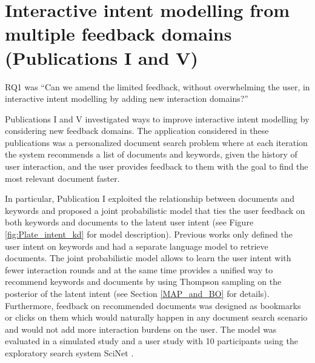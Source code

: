 \documentclass[dissertation,math,vertlayout,pdfa,colorlinks]{aaltoseries}
\begin{document}
\section{Interactive intent modelling from multiple feedback domains (Publications I and V)}


RQ1 was ``Can we amend the limited feedback, without overwhelming the user, in interactive intent modelling by adding new interaction domains?''

Publications I and V investigated ways to improve interactive intent modelling by considering new feedback domains. The application considered in these publications was a personalized document search problem where at each iteration the system recommends a list of documents and keywords, given the history of user interaction, and the user provides feedback to them with the goal to find the most relevant document faster.

In particular, Publication I exploited the relationship between documents and keywords and proposed a joint probabilistic model that ties the user feedback on both keywords and documents to the latent user intent (see Figure \ref{fig:Plate_intent_kd} for model description). Previous works \cite{GlowIUI2013,ruotsalo2015interactive} only defined the user intent on keywords and had a separate language model to retrieve documents. The joint probabilistic model allows to learn the user intent with fewer interaction rounds and at the same time provides a unified way to recommend keywords and documents by using Thompson sampling on the posterior of the latent intent (see Section \ref{MAP_and_BO} for details). Furthermore, feedback on recommended documents was designed as bookmarks or clicks on them which would naturally happen in any document search scenario and would not add more interaction burdens on the user. The model was evaluated in a simulated study and a user study with 10 participants using the exploratory search system SciNet \cite{GlowIUI2013}. 
\end{document}
